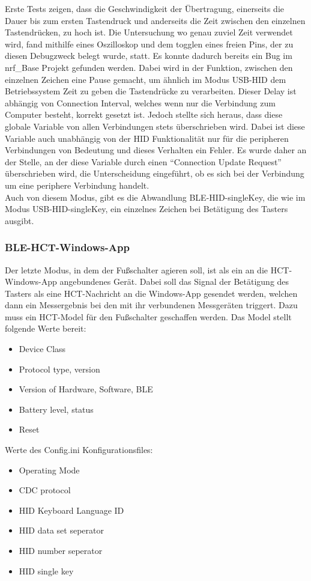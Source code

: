Erste Tests zeigen, dass die Geschwindigkeit der Übertragung, einerseits die Dauer bis zum ersten Tastendruck und anderseits die Zeit zwischen den einzelnen Tastendrücken, zu hoch ist. Die Untersuchung wo genau zuviel Zeit verwendet wird, fand mithilfe eines Oszilloskop und dem togglen eines freien Pins, der zu diesen Debugzweck belegt wurde, statt. Es konnte dadurch bereits ein Bug im nrf\_Base Projekt gefunden werden. Dabei wird in der Funktion, zwischen den einzelnen Zeichen eine Pause gemacht, um ähnlich im Modus USB-\ac{HID} dem Betriebssystem Zeit zu geben die Tastendrücke zu verarbeiten. Dieser Delay ist abhängig von Connection Interval, welches wenn nur die Verbindung zum Computer besteht, korrekt gesetzt ist. Jedoch stellte sich heraus, dass diese globale Variable von allen Verbindungen stets überschrieben wird. Dabei ist diese Variable auch unabhängig von der \ac{HID} Funktionalität nur für die peripheren Verbindungen von Bedeutung und dieses Verhalten ein Fehler. Es wurde daher an der Stelle, an der diese Variable durch einen ``Connection Update Request'' überschrieben wird, die Unterscheidung eingeführt, ob es sich bei der Verbindung um eine periphere Verbindung handelt.\\
Auch von diesem Modus, gibt es die Abwandlung \ac{BLE}-\ac{HID}-singleKey, die wie im Modus USB-\ac{HID}-singleKey, ein einzelnes Zeichen bei Betätigung des Tasters ausgibt.


\subsubsection{BLE-HCT-Windows-App}
Der letzte Modus, in dem der Fußschalter agieren soll, ist als ein an die \ac{HCT}-Windows-App angebundenes Gerät. Dabei soll das Signal der Betätigung des Tasters als eine \ac{HCT}-Nachricht an die Windows-App gesendet werden, welchen dann ein Messergebnis bei den mit ihr verbundenen Messgeräten triggert. Dazu muss ein \ac{HCT}-Model für den Fußschalter geschaffen werden. Das Model stellt folgende Werte bereit:
\begin{itemize}
	\item Device Class
	\item Protocol type, version 
	\item Version of Hardware, Software, \ac{BLE}
	\item Battery level, status
	\item Reset 
\end{itemize}

Werte des Config.ini Konfigurationsfiles:
\begin{itemize}
	\item Operating Mode 
	\item CDC protocol 
	\item HID Keyboard Language ID 
	\item HID data set seperator 
	\item HID number seperator
	\item HID single key 
\end{itemize}

